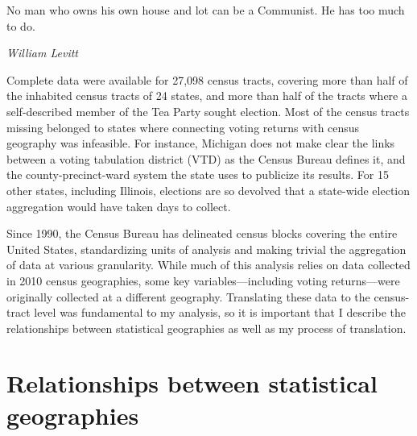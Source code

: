 \documentclass[12pt,oneside]{psthesis}
\begin{document}
\epigraph{No man who owns his own house and lot can be a Communist. He has too much to do.}{\textit{William Levitt}}

Complete data were available for 27,098 census tracts, covering more than half of the inhabited census tracts of 24 states, and more than half of the tracts where a self-described member of the Tea Party sought election.
Most of the census tracts missing belonged to states where connecting voting returns with census geography was infeasible.
For instance, Michigan does not make clear the links between a voting tabulation district (VTD) as the Census Bureau defines it, and the county-precinct-ward system the state uses to publicize its results.
For 15 other states, including Illinois, elections are so devolved that a state-wide election aggregation would have taken days to collect.

Since 1990, the Census Bureau has delineated census blocks covering the entire United States, standardizing units of analysis and making trivial the aggregation of data at various granularity.
While much of this analysis relies on data collected in 2010 census geographies, some key variables---including voting returns---were originally collected at a different geography.
Translating these data to the census-tract level was fundamental to my analysis, so it is important that I describe the relationships between statistical geographies as well as my process of translation.

\hypertarget{census-geography}{%
\section{Relationships between statistical geographies}\label{census-geography}}
\end{document}
